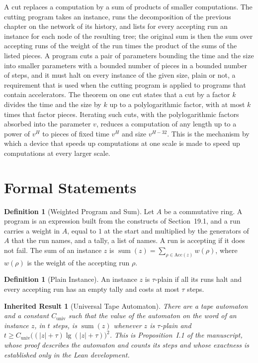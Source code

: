 \documentclass[11pt,letterpaper]{report}
\theoremstyle{plain}
\newtheorem{inherited}[theorem]{Inherited Result}
\theoremstyle{definition}
\newtheorem{definition}[theorem]{Definition}
\theoremstyle{remark}
\begin{document}
A cut replaces a computation by a sum of products of smaller computations. The cutting program takes an instance, runs the decomposition of the previous chapter on the network of its history, and lists for every accepting run an instance for each node of the resulting tree; the original sum is then the sum over accepting runs of the weight of the run times the product of the sums of the listed pieces. A program cuts a pair of parameters bounding the time and the size into smaller parameters with a bounded number of pieces in a bounded number of steps, and it must halt on every instance of the given size, plain or not, a requirement that is used when the cutting program is applied to programs that contain accelerators. The theorem on one cut states that a cut by a factor $k$ divides the time and the size by $k$ up to a polylogarithmic factor, with at most $k$ times that factor pieces. Iterating such cuts, with the polylogarithmic factors absorbed into the parameter $v$, reduces a computation of any length up to a power of $v^H$ to pieces of fixed time $v^H$ and size $v^{H-32}$. This is the mechanism by which a device that speeds up computations at one scale is made to speed up computations at every larger scale.

\section{Formal Statements}

\begin{definition}[Weighted Program and Sum]
Let $A$ be a commutative ring. A program is an expression built from the constructs of Section~19.1, and a run carries a weight in $A$, equal to $1$ at the start and multiplied by the generators of $A$ that the run names, and a tally, a list of names. A run is accepting if it does not fail. The sum of an instance $z$ is $\operatorname{sum}(z)=\sum_{\rho\in\mathrm{Acc}(z)}w(\rho)$, where $w(\rho)$ is the weight of the accepting run $\rho$.
\end{definition}

\begin{definition}[Plain Instance]
An instance $z$ is $\tau$-plain if all its runs halt and every accepting run has an empty tally and costs at most $\tau$ steps.
\end{definition}

\begin{inherited}[Universal Tape Automaton]\label{inh:univ}
There are a tape automaton and a constant $C_{\mathrm{univ}}$ such that the value of the automaton on the word of an instance $z$, in $t$ steps, is $\operatorname{sum}(z)$ whenever $z$ is $\tau$-plain and $t\ge C_{\mathrm{univ}}\bigl((|z|+\tau)\lg(|z|+\tau)\bigr)^2$. This is Proposition~I.1 of the manuscript, whose proof describes the automaton and counts its steps and whose exactness is established only in the Lean development.
\end{inherited}
\end{document}
